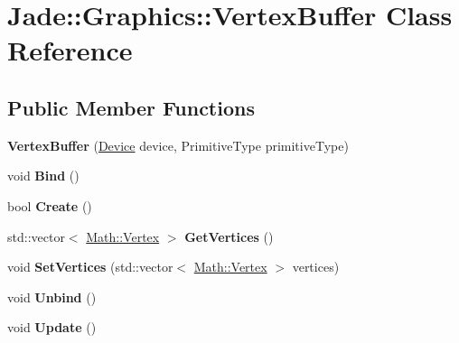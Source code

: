 \hypertarget{class_jade_1_1_graphics_1_1_vertex_buffer}{}\section{Jade\+:\+:Graphics\+:\+:Vertex\+Buffer Class Reference}
\label{class_jade_1_1_graphics_1_1_vertex_buffer}
\subsection*{Public Member Functions}
\begin{DoxyCompactItemize}
\item 
\hypertarget{class_jade_1_1_graphics_1_1_vertex_buffer_aaf549d4196ba9f478e41a0910eebb71c}{}{\bfseries Vertex\+Buffer} (\hyperlink{class_jade_1_1_graphics_1_1_device}{Device} device, Primitive\+Type primitive\+Type)\label{class_jade_1_1_graphics_1_1_vertex_buffer_aaf549d4196ba9f478e41a0910eebb71c}

\item 
\hypertarget{class_jade_1_1_graphics_1_1_vertex_buffer_a4ee04daf19a1d243150048605699e75b}{}void {\bfseries Bind} ()\label{class_jade_1_1_graphics_1_1_vertex_buffer_a4ee04daf19a1d243150048605699e75b}

\item 
\hypertarget{class_jade_1_1_graphics_1_1_vertex_buffer_adc3f97a200bd61c607bad78fb776a01e}{}bool {\bfseries Create} ()\label{class_jade_1_1_graphics_1_1_vertex_buffer_adc3f97a200bd61c607bad78fb776a01e}

\item 
\hypertarget{class_jade_1_1_graphics_1_1_vertex_buffer_af9949ba0bf4f9309e38d0b5f2f1759f9}{}std\+::vector$<$ \hyperlink{struct_jade_1_1_math_1_1_vertex}{Math\+::\+Vertex} $>$ {\bfseries Get\+Vertices} ()\label{class_jade_1_1_graphics_1_1_vertex_buffer_af9949ba0bf4f9309e38d0b5f2f1759f9}

\item 
\hypertarget{class_jade_1_1_graphics_1_1_vertex_buffer_a3e5439468988ce5f4e66ba4fe6a0fda1}{}void {\bfseries Set\+Vertices} (std\+::vector$<$ \hyperlink{struct_jade_1_1_math_1_1_vertex}{Math\+::\+Vertex} $>$ vertices)\label{class_jade_1_1_graphics_1_1_vertex_buffer_a3e5439468988ce5f4e66ba4fe6a0fda1}

\item 
\hypertarget{class_jade_1_1_graphics_1_1_vertex_buffer_a33bd36a104e809fe035bdf4ca75fb5ce}{}void {\bfseries Unbind} ()\label{class_jade_1_1_graphics_1_1_vertex_buffer_a33bd36a104e809fe035bdf4ca75fb5ce}

\item 
\hypertarget{class_jade_1_1_graphics_1_1_vertex_buffer_a81df74dd0fec4434ba87a9ca01834317}{}void {\bfseries Update} ()\label{class_jade_1_1_graphics_1_1_vertex_buffer_a81df74dd0fec4434ba87a9ca01834317}

\end{DoxyCompactItemize}


